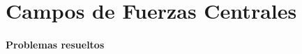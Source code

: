 \documentclass[/home/hernan-barquero/Documents/Apuntes_mecanica_teorica/main.tex]{subfiles}
\begin{document}
    \part{Campos de Fuerzas Centrales}

    \subsection{Problemas resueltos}
    
\end{document}
